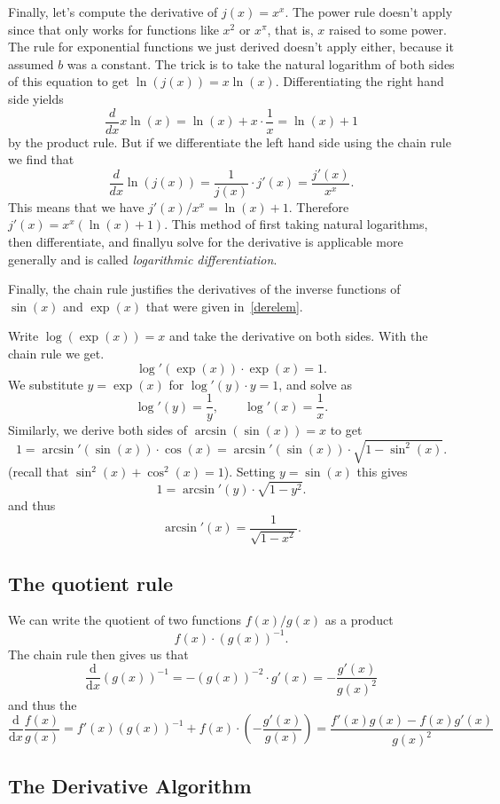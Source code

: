 \begin{bsp}
Finally, let's compute the derivative of $j(x) = x^x$. The power rule doesn't
apply since that only works for functions like $x^2$ or $x^\pi$, that is, $x$
raised to some power. The rule for exponential functions we just derived
doesn't apply either, because it assumed $b$ was a constant. The trick is to
take the natural logarithm of both sides of this equation to get $\ln(j(x)) =
x\ln(x)$. Differentiating the right hand side yields
\[
\frac{d}{dx}x\ln(x) = \ln(x) + x\cdot\frac{1}{x} = \ln(x)+1
\]
by the product rule. But if we differentiate the left hand side using the
chain rule we find that
\[
\frac{d}{dx}\ln(j(x)) = \frac{1}{j(x)} \cdot j'(x) = \frac{j'(x)}{x^x}.
\]
This means that we have $j'(x)/x^x = \ln(x)+1$. Therefore $j'(x) =
x^x(\ln(x)+1)$. 
This method of first taking natural logarithms, then differentiate, and
finallyu solve for the derivative is applicable more generally and is called
\textit{logarithmic differentiation}.
\end{bsp}
\medskip

Finally, the chain rule justifies the derivatives of the inverse functions
of $\sin(x)$ and $\exp(x)$ that were given in~\ref{derelem}.

Write
$\log(\exp(x))=x$ and take the derivative on both sides. With the chain rule
we get.
\[
\log'(\exp(x))\cdot\exp(x)=1.
\]
We substitute $y=\exp(x)$ for $\log'(y)\cdot y=1$, and solve as
\[
\log'(y)=\frac{1}{y}, \qquad \log'(x)=\frac{1}{x}.
\]
Similarly, we derive both sides of $\arcsin(\sin(x))=x$ to get
\[
1=\arcsin'(\sin(x))\cdot\cos(x)=\arcsin'(\sin(x))\cdot\sqrt{1-\sin^2(x)}.
\]
(recall that $\sin^2(x)+\cos^2(x)=1$).
Setting $y=\sin(x)$ this gives
\[
1=\arcsin'(y)\cdot\sqrt{1-y^2}.
\]
and thus
\[
\arcsin'(x)=\frac{1}{\sqrt{1-x^2}}.
\]


\subsection{The quotient rule}

We can write the quotient of two functions $f(x)/g(x)$ as a product
\[
f(x)\cdot (g(x))^{-1}.
\]
The chain rule then gives us that
\[
\frac{\mbox{d}}{\mbox{d}x}\left(g(x)\right)^{-1}
=-\left(g(x)\right)^{-2}\cdot g'(x)=-\frac{g'(x)}{g(x)^2}
\]
and thus the 
\[
\frac{\mbox{d}}{\mbox{d}x}\frac{f(x)}{g(x)}=f'(x)(g(x))^{-1}+f(x)\cdot\left(-\frac{g'(x)}{g(x)}\right)
=\frac{f'(x)g(x)-f(x)g'(x)}{g(x)^2}
\]


\subsection{The Derivative Algorithm}

